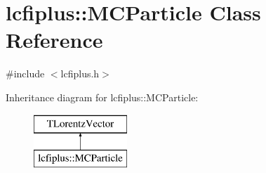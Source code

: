 \section{lcfiplus\+:\+:M\+C\+Particle Class Reference}
\label{classlcfiplus_1_1MCParticle}


{\ttfamily \#include $<$lcfiplus.\+h$>$}

Inheritance diagram for lcfiplus\+:\+:M\+C\+Particle\+:\begin{figure}[H]
\begin{center}
\leavevmode
\includegraphics[height=2.000000cm]{classlcfiplus_1_1MCParticle}
\end{center}
\end{figure}
